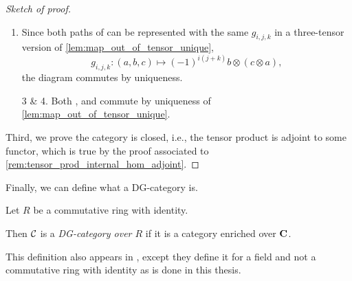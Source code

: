 \begin{proof}[Sketch of proof]
\begin{enumerate}
{\begin{center}
            \end{center}
            commutes.

            Let \( a \in A_i \) and \( b \in B_j \), and consider the following equation,
            \begin{align*}
                (g \otimes f)_{i + j} \circ s_{i + j} (a \otimes b) &= (g \otimes f)_{i + j} ((-1)^{ij}b \otimes a) \\
                &= (-1)^{ij} g_j(b) \otimes f_i(a) \\
                &= s_{i + j}(f_i(a) \otimes g_j(b)) \\
                &= s_{i + j} \circ (f \otimes g)_{i + j} (a \otimes b).
            \end{align*}
            By the above equation, along with the uniqueness from \autoref{lem:map_out_of_tensor_unique}, the above diagram commutes.
        }
        \item {
            Since both paths of \cite[Diagram 6.3]{Borceux_1994} can be represented with the same \( g_{i, j, k} \) in a three-tensor version of \autoref{lem:map_out_of_tensor_unique},
            \[
                g_{i, j, k}: (a, b, c) \mapsto (-1)^{i(j + k)}b \otimes (c \otimes a),
            \]
            the diagram commutes by uniqueness.
        }
        \item[3 \& 4.] {
            Both \cite[Diagram 6.4]{Borceux_1994}, and \cite[Diagram 6.5]{Borceux_1994} commute by uniqueness of \autoref{lem:map_out_of_tensor_unique}.
        }
    \end{enumerate}

    Third, we prove the category is closed, i.e., the tensor product is adjoint to some functor, which is true by the proof associated to \autoref{rem:tensor_prod_internal_hom_adjoint}.
\end{proof}

Finally, we can define what a DG-category is.

\begin{definition}[DG-category]
    \label{def:dg_cat}
    Let \( R \) be a commutative ring with identity.

    Then \( {\mathcal{C}} \) is a \emph{DG-category over \( R \)} if it is a category enriched over \( \operatorname{\mathbf{C}} \).
\end{definition}

This definition also appears in \cite[p.\ 29]{Jasso-Muro_2023}, except they define it for a field and not a commutative ring with identity as is done in this thesis.